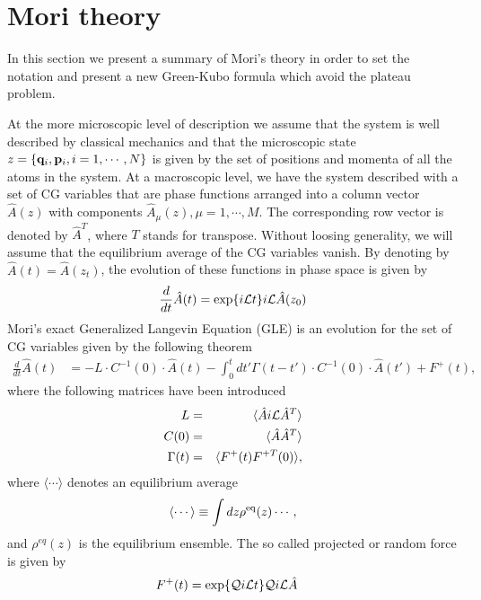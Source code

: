 \documentclass[a4paper,openright,12pt]{book}
\newcommand{\esc}{\!\cdot\!}
\begin{document}
\section{Mori theory}
\label{Sec:Mori}
In this section we present a summary of Mori's theory in order to
set the notation and present a new Green-Kubo formula which avoid the plateau problem. 


At the more microscopic level of description we assume that the system is  well described  by classical  mechanics and  that the  microscopic state $z=\{{\bf q}_i,{\bf p}_i,i=1,\cdots,N\}$  is given by the set of positions  and momenta  of all  the atoms  in the  system.
At a macroscopic  level, we have  the system described with a  set of CG variables  that are phase functions arranged  into a column vector  $\hat{A}(z)$ with components $\hat{A}_\mu(z),\mu=1,\cdots,M$.   
The  corresponding  row  vector  is denoted  by  $\hat{A}^T$, where  $T$  stands  for transpose.   
Without loosing generality, we will assume that the equilibrium average of the CG variables  vanish.  
By  denoting by  $\hat{A}(t)=\hat{A}(z_t)$, the evolution of these functions in phase space is given by
\begin{eqnarray}
\frac{d}{dt}{\hat{A}}(t)=\exp\{i{\cal L}t\}i{\cal L}\hat{A}(z_0)
\label{LA}
\end{eqnarray}
Mori's  exact  Generalized Langevin  Equation  (GLE)  is an  evolution for the set of CG variables given by the following theorem
\begin{align}
\frac{d}{dt}\hat{A}(t) &= -L\esc C^{-1}(0)\esc \hat{A} (t)
-\int_0^tdt'\Gamma(t-t')\esc  C^{-1}(0)\esc \hat{A} (t') +F^+(t),
\label{exact}
\end{align}
where the following matrices have been introduced
\begin{eqnarray}
L&=&\langle \hat{A}i{\cal L}\hat{A}^T\rangle
\nonumber\\
C(0)&=&\langle \hat{A}\hat{A}^T\rangle
\nonumber\\
\Gamma(t)&=&\langle F^+(t)F^{+T}(0)\rangle,
\label{def}
\end{eqnarray}
where  $\langle\cdots \rangle$
denotes an equilibrium average
\begin{equation}
\langle\cdots\rangle\equiv \int dz\rho^{\rm eq}(z)\cdots,
\label{esc}
\end{equation}
and  $\rho^{eq}(z)$ is  the  equilibrium  ensemble.
The so called projected or random force is given by
\begin{align}
F^+(t)&= \exp\{{\cal Q}i{\cal L}t\} {\cal Q}i{\cal L}\hat{A}  
\label{Proj}
\end{align}
\end{document}
